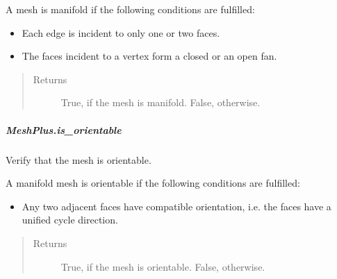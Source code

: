 \documentclass[letterpaper,10pt,english]{sphinxmanual}
\begin{document}
\begin{fulllineitems}
\begin{fulllineitems}
A mesh is manifold if the following conditions are fulfilled:
\begin{itemize}
\item {} 
Each edge is incident to only one or two faces.

\item {} 
The faces incident to a vertex form a closed or an open fan.

\end{itemize}
\begin{quote}\begin{description}
\item[{Returns}] \leavevmode
{} \textendash{} True, if the mesh is manifold.
False, otherwise.

\end{description}\end{quote}

\end{fulllineitems}



\subparagraph{MeshPlus.is\_orientable}
\label{\detokenize{api/generated/directional_clustering.mesh.MeshPlus.is_orientable:meshplus-is-orientable}}\label{\detokenize{api/generated/directional_clustering.mesh.MeshPlus.is_orientable::doc}}

\begin{fulllineitems}
\label{\detokenize{api/generated/directional_clustering.mesh.MeshPlus.is_orientable:directional_clustering.mesh.MeshPlus.is_orientable}}
Verify that the mesh is orientable.

A manifold mesh is orientable if the following conditions are fulfilled:
\begin{itemize}
\item {} 
Any two adjacent faces have compatible orientation, i.e. the faces have a unified cycle direction.

\end{itemize}
\begin{quote}\begin{description}
\item[{Returns}] \leavevmode
{} \textendash{} True, if the mesh is orientable.
False, otherwise.

\end{description}\end{quote}


\end{fulllineitems}
\end{fulllineitems}
\end{document}
